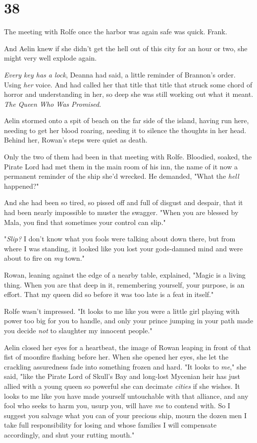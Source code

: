 
\chapter{38}

The meeting with Rolfe once the harbor was again safe was quick.
Frank.

And Aelin knew if she didn't get the hell out of this city for an hour or two, she might very well explode again.

\emph{Every key has a lock}, Deanna had said, a little reminder of Brannon's order.
Using \emph{her} voice.
And had called her that title  that title that struck some chord of horror and understanding in her, so deep she was still working out what it meant.
\emph{The Queen Who Was Promised}.

Aelin stormed onto a spit of beach on the far side of the island, having run here, needing to get her blood roaring, needing it to silence the thoughts in her head.
Behind her, Rowan's steps were quiet as death.

Only the two of them had been in that meeting with Rolfe.
Bloodied, soaked, the Pirate Lord had met them in the main room of his inn, the name of it now a permanent reminder of the ship she'd wrecked.
He demanded, "What the \emph{hell} happened?"

And she had been so tired, so pissed off and full of disgust and despair, that it had been nearly impossible to muster the swagger.
"When you are blessed by Mala, you find that sometimes your control can slip."

"\emph{Slip?} I don't know what you fools were talking about down there, but from where I was standing, it looked like you lost your gods-damned mind and were about to fire on \emph{my} town."

Rowan, leaning against the edge of a nearby table, explained, "Magic is a living thing.
When you are that deep in it, remembering yourself, your purpose, is an effort.
That my queen did so before it was too late is a feat in itself."

Rolfe wasn't impressed.
"It looks to me like you were a little girl playing with power too big for you to handle, and only your prince jumping in your path made you decide \emph{not} to slaughter my innocent people."

Aelin closed her eyes for a heartbeat, the image of Rowan leaping in front of that fist of moonfire flashing before her.
When she opened her eyes, she let the crackling assuredness fade into something frozen and hard.
"It looks to \emph{me}," she said, "like the Pirate Lord of Skull's Bay and long-lost Mycenian heir has just allied with a young queen so powerful she can decimate \emph{cities} if she wishes.
It looks to me like you have made yourself untouchable with that alliance, and any fool who seeks to harm you, usurp you, will have \emph{me} to contend with.
So I suggest you salvage what you can of your precious ship, mourn the dozen men I take full responsibility for losing and whose families I will compensate accordingly, and shut your rutting mouth."

